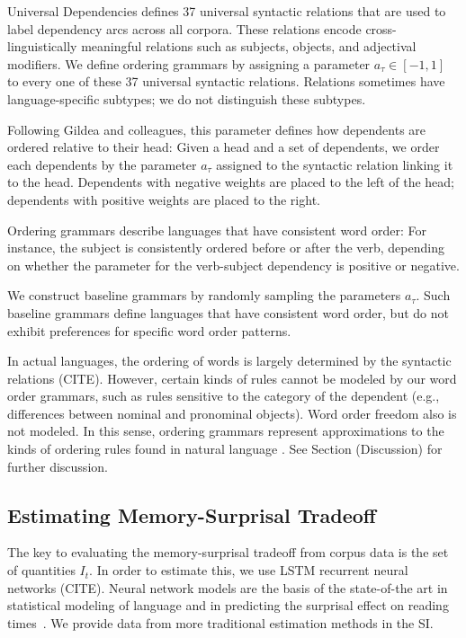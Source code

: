 Universal Dependencies defines 37 universal syntactic relations that are used to label dependency arcs across all corpora.
These relations encode cross-linguistically meaningful relations such as subjects, objects, and adjectival modifiers.
We define ordering grammars by assigning a parameter $a_\tau \in [-1,1]$ to every one of these 37 universal syntactic relations.
Relations sometimes have language-specific subtypes; we do not distinguish these subtypes.

Following Gildea and colleagues, this parameter defines how dependents are ordered relative to their head:
Given a head and a set of dependents, we order each dependents by the parameter $a_\tau$ assigned to the syntactic relation linking it to the head.
Dependents with negative weights are placed to the left of the head; dependents with positive weights are placed to the right.

Ordering grammars describe languages that have consistent word order:
For instance, the subject is consistently ordered before or after the verb, depending on whether the parameter for the verb-subject dependency is positive or negative.

We construct baseline grammars by randomly sampling the parameters $a_\tau$.
Such baseline grammars define languages that have consistent word order, but do not exhibit preferences for specific word order patterns.


In actual languages, the ordering of words is largely determined by the syntactic relations (CITE).
However, certain kinds of rules cannot be modeled by our word order grammars, such as rules sensitive to the category of the dependent (e.g., differences between nominal and pronominal objects).
Word order freedom also is not modeled.
In this sense, ordering grammars represent approximations to the kinds of ordering rules found in natural language \citep{gildea-optimizing-2007, gildea-grammars-2010, gildea-human-2015}.
See Section (Discussion) for further discussion.



\subsection{Estimating Memory-Surprisal Tradeoff}\label{sec:method}
The key to evaluating the memory-surprisal tradeoff from corpus data is the set of quantities $I_t$.
In order to estimate this, we use LSTM recurrent neural networks (CITE).
Neural network models are the basis of the state-of-the art in statistical modeling of language and in predicting the surprisal effect on reading times~\citep{frank-insensitivity-2011, goodkind-predictive-2018}.
We provide data from more traditional estimation methods in the SI.



